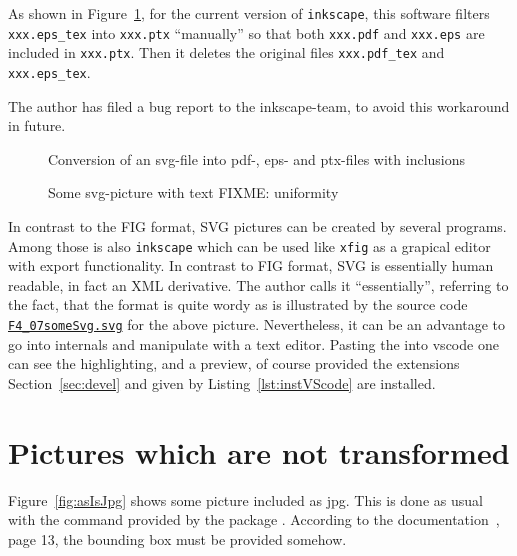 As shown in Figure~\ref{fig:svg2pdf},
for the current version of \texttt{inkscape},
this software filters \texttt{xxx.eps\_tex} into \texttt{xxx.ptx}
``manually'' so that both \texttt{xxx.pdf} and \texttt{xxx.eps}
are included in \texttt{xxx.ptx}.
Then it deletes the original files
\texttt{xxx.pdf\_tex} and \texttt{xxx.eps\_tex}.

The author has filed a bug report to the inkscape-team,
to avoid this workaround in future. 

\begin{figure}[htb]
\centering
{}
\caption{\label{fig:svg2pdf}Conversion of an svg-file 
into pdf-, eps- and ptx-files with inclusions}
\end{figure}


\begin{figure}[htb]
\centering
\caption{\label{fig:svgWithText}Some svg-picture with text FIXME\@: uniformity  }
\end{figure}

In contrast to the FIG format, 
SVG pictures can be created by several programs. 
Among those is also \texttt{inkscape} 
which can be used like \texttt{xfig}  
as a grapical editor with export functionality. 
In contrast to FIG format, 
SVG is essentially human readable, 
in fact an XML derivative. 
The author calls it ``essentially'', 
referring to the fact, that the format is quite wordy 
as is illustrated by the source code 
\href{\urlSite fromTex/F4_07someSvg.svg}{\texttt{F4\_07someSvg.svg}} 
for the above picture. 
Nevertheless, it can be an advantage 
to go into internals and manipulate with a text editor. 
Pasting the into vscode one can see the highlighting, 
and a preview, 
of course provided the extensions Section~\ref{sec:devel} 
and given by Listing~\ref{lst:instVScode} are installed. 


\section{Pictures which are not transformed}\label{sec:picasis}

Figure~\ref{fig:asIsJpg} shows some picture included as jpg. 
This is done as usual with the command 
provided by the package . 
According to the documentation~\cite{GraX}, page 13, 
the bounding box must be provided somehow. 

